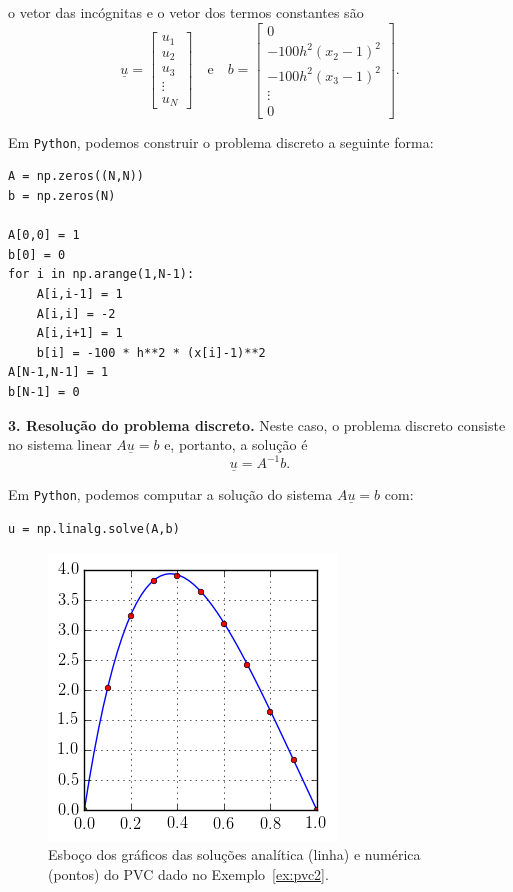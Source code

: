 \begin{sol}
o vetor das incógnitas e o vetor dos termos constantes são
\begin{equation*}
  \underline{u} =
  \begin{bmatrix}
    u_1\\
    u_2\\
    u_3\\
    \vdots\\
    u_N
  \end{bmatrix}\quad\text{e}\quad
  b =
  \begin{bmatrix}
    0\\
    -100h^{2}(x_2-1)^2\\
    -100h^{2}(x_3-1)^2\\
    \vdots\\
    0
  \end{bmatrix}.
\end{equation*}

\ifispython
Em \verb+Python+, podemos construir o problema discreto a seguinte forma:
\begin{verbatim}
A = np.zeros((N,N))
b = np.zeros(N)

A[0,0] = 1
b[0] = 0
for i in np.arange(1,N-1):
    A[i,i-1] = 1
    A[i,i] = -2
    A[i,i+1] = 1
    b[i] = -100 * h**2 * (x[i]-1)**2
A[N-1,N-1] = 1
b[N-1] = 0
\end{verbatim}
\fi

{\bf 3. Resolução do problema discreto.} Neste caso, o problema discreto consiste no sistema linear $A\underline{u} = b$ e, portanto, a solução é
\begin{equation}\label{eq:pvc2_numerica}
  \underline{u} = A^{-1}b.
\end{equation}

\ifispython
Em \verb+Python+, podemos computar a solução do sistema $A\underline{u} = b$ com:
\begin{verbatim}
u = np.linalg.solve(A,b)
\end{verbatim}
\fi

\begin{figure}
  \centering
  \includegraphics{./cap_pvc/pics/ex_pvc2/ex_pvc2}
  \caption{Esboço dos gráficos das soluções analítica (linha) e numérica (pontos) do PVC dado no Exemplo~\ref{ex:pvc2}.}
  \label{fig:ex_pvc2}
\end{figure}


\end{sol}
